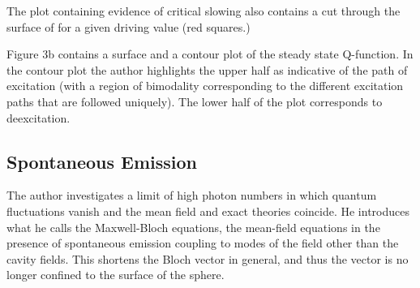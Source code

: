The plot containing evidence of critical slowing also contains a cut through the surface of \autocite[Figure 2]{Carmichael2015} for a given driving value (red squares.)

Figure 3b contains a surface and a contour plot of the steady state Q-function. In the contour plot the author highlights the upper half as indicative of the path of excitation (with a region of bimodality corresponding to the different excitation paths that are followed uniquely). The lower half of the plot corresponds to deexcitation.

\subsection{Spontaneous Emission}

The author investigates a limit of high photon numbers in which quantum fluctuations vanish and the mean field and exact theories coincide. He introduces what he calls the Maxwell-Bloch equations, the mean-field equations in the presence of spontaneous emission coupling to modes of the field other than the cavity fields. This shortens the Bloch vector in general, and thus the vector is no longer confined to the surface of the sphere.

